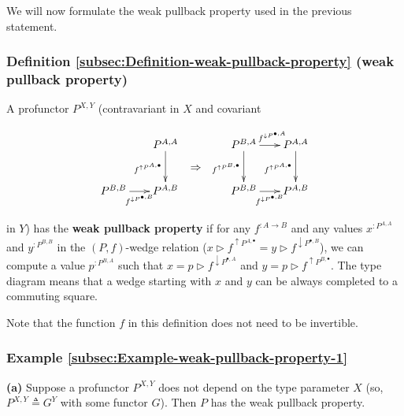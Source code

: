 We will now formulate the weak pullback property used in the previous
statement. 

\subsubsection{Definition \label{subsec:Definition-weak-pullback-property}\ref{subsec:Definition-weak-pullback-property}
(weak pullback property)}

A profunctor $P^{X,Y}$ (contravariant in $X$ and covariant%
\begin{comment}
empty arrow
\end{comment}

\begin{wrapfigure}{l}{0.41\columnwidth}%
\vspace{-2\baselineskip}
\[
\xymatrix{\xyScaleY{2.3pc}\xyScaleX{1.5pc} & P^{A,A}\ar[d]\sb(0.5){f^{\uparrow P^{A,\bullet}}} & \ar@{}[d]\sb(0.5){\displaystyle \Rightarrow} & P^{B,A}\ar[r]\sp(0.55){f^{\downarrow P^{\bullet,A}}}\ar[d]\sb(0.5){f^{\uparrow P^{B,\bullet}}} & P^{A,A}\ar[d]\sb(0.5){f^{\uparrow P^{A,\bullet}}}\\
P^{B,B}\ar[r]\sb(0.5){f^{\downarrow P^{\bullet,B}}} & P^{A,B} &  & P^{B,B}\ar[r]\sb(0.5){f^{\downarrow P^{\bullet,B}}} & P^{A,B}
}
\]

\vspace{-2\baselineskip}
\end{wrapfigure}%

\noindent in $Y$) has the \textbf{weak pullback property} if for
any $f^{:A\rightarrow B}$ and any values $x^{:P^{A,A}}$ and $y^{:P^{B,B}}$
in the $\left(P,f\right)$-wedge relation ($x\triangleright f^{\uparrow P^{A,\bullet}}=y\triangleright f^{\downarrow P^{\bullet,B}}$),
we can compute a value $p^{:P^{B,A}}$ such that $x=p\triangleright f^{\downarrow P^{\bullet,A}}$
and $y=p\triangleright f^{\uparrow P^{B,\bullet}}$. The type diagram
means that a wedge starting with $x$ and $y$ can be always completed
to a commuting square.

Note that the function $f$ in this definition does not need to be
invertible.

\subsubsection{Example \label{subsec:Example-weak-pullback-property-1}\ref{subsec:Example-weak-pullback-property-1}}

\textbf{(a)} Suppose a profunctor $P^{X,Y}$ does not depend on the
type parameter $X$ (so, $P^{X,Y}\triangleq G^{Y}$ with some functor
$G$). Then $P$ has the weak pullback property. 

